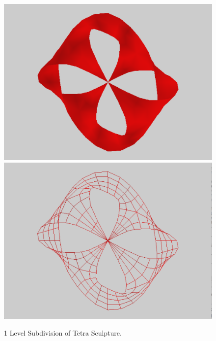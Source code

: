\documentclass[12pt]{article}
\begin{document}
\begin{figure}[h!]
  \centering
    \includegraphics[width=\textwidth]{Tetra1}
    \includegraphics[width=\textwidth]{Tetra1w}
  \caption{1 Level Subdivision of Tetra Sculpture.} \label{figure:Tetra1}
\end{figure}
\end{document}
